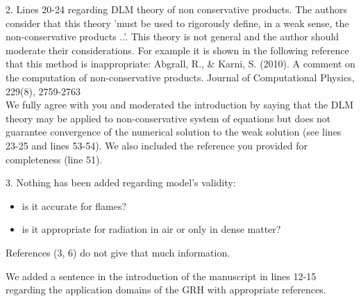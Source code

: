 \documentclass{article}
\begin{document}
{\color{blue}
 2. Lines 20-24 regarding DLM theory of non conservative products. The authors consider that this theory 'must be used to rigorously define, in a weak sense, the non-conservative products ..'. This theory is not general and the author should moderate their considerations. For example it is shown in the following reference that this method is inappropriate:
Abgrall, R., \& Karni, S. (2010). A comment on the computation of non-conservative products. Journal of Computational Physics, 229(8), 2759-2763\\}
We fully agree with you and moderated the introduction by saying that the DLM theory may be applied to non-conservative system of equations but does not guarantee convergence of the numerical solution to the weak solution (see lines 23-25 and lines 53-54). We also included the reference you provided for completeness (line 51).
\bigskip

{\color{blue}
3. Nothing has been added regarding model's validity:
\begin{itemize}
\item is it accurate for flames?
\item is it appropriate for radiation in air or only in dense matter?
\end{itemize}
References (3, 6) do not give that much information.\\}
We added a sentence in the introduction of the manuscript in lines 12-15 regarding the application domains of the GRH with appropriate references.\\
\end{document}
